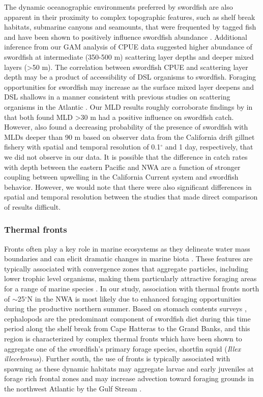 The dynamic oceanographic environments preferred by swordfish are also apparent in their proximity to complex topographic features, such as shelf break habitats, submarine canyons and seamounts, that were frequented by tagged fish \citep{Podesta1993, Neilson2009, Palko1981} and have been shown to positively influence swordfish abundance \citep{Hazin2008, Bigelow1999, Scales2017}. Additional inference from our GAM analysis of CPUE data suggested higher abundance of swordfish at intermediate (350-500 m) scattering layer depths and deeper mixed layers (>50 m). The correlation between swordfish CPUE and scattering layer depth may be a product of accessibility of DSL organisms to swordfish. Foraging opportunities for swordfish may increase as the surface mixed layer deepens and DSL shallows in a manner consistent with previous studies on scattering organisms in the Atlantic \citep{Marchal1993}. Our MLD results roughly corroborate findings by \citet{Scales2017} in that both found MLD >30 m had a positive influence on swordfish catch. However, \citet{Scales2017} also found a decreasing probability of the presence of swordfish with MLDs deeper than 90 m based on observer data from the California drift gillnet fishery with spatial and temporal resolution of 0.1$^{\circ}$ and 1 day, respectively, that we did not observe in our data. It is possible that the difference in catch rates with depth between the eastern Pacific and NWA are a function of stronger coupling between upwelling in the California Current system and swordfish behavior. However, we would note that there were also significant differences in spatial and temporal resolution between the studies that made direct comparison of results difficult.

\subsubsection{Thermal fronts}

Fronts often play a key role in marine ecosystems as they delineate water mass boundaries and can elicit dramatic changes in marine biota \citep{bakun2006fronts}. These features are typically associated with convergence zones that aggregate particles, including lower trophic level organisms, making them particularly attractive foraging areas for a range of marine species \citep{Bost2009, Polovina2000, Scales2015, Teo2007, Miller2015, Queiroz2016}. In our study, association with thermal fronts north of $\sim$25$^{\circ}$N in the NWA is most likely due to enhanced foraging opportunities during the productive northern summer. Based on stomach contents surveys \citep{Stillwell1985}, cephalopods are the predominant component of swordfish diet during this time period along the shelf break from Cape Hatteras to the Grand Banks, and this region is characterized by complex thermal fronts which have been shown to aggregate one of the swordfish's primary forage species, shortfin squid (\emph{Illex illecebrosus})\citep{Wilk1988}. Further south, the use of fronts is typically associated with spawning as these dynamic habitats may aggregate larvae and early juveniles at forage rich frontal zones \citep{Rooker2012, Suca2017} and may increase advection toward foraging grounds in the northwest Atlantic by the Gulf Stream \citep{Olson1994}.

